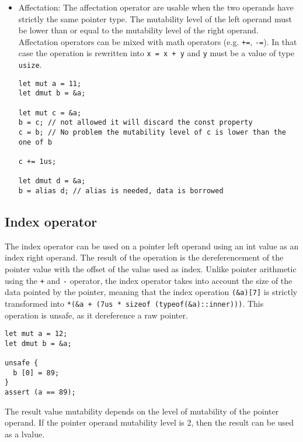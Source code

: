 \begin{itemize}
\item Affectation: The affectation operator are usable when the two operands
  have strictly the same pointer type. The mutability level of the left operand
  must be lower than or equal to the mutability level of the right operand.
  Affectation operators can be mixed with math operators (e.g. \texttt{+=},
  \texttt{-=}). In that case the operation is rewritten into \texttt{x = x + y}
  and \texttt{y} must be a value of type \texttt{usize}.

  \begin{lstlisting}[style=coloredverbatim]
let mut a = 11;
let dmut b = &a;

let mut c = &a;
b = c; // not allowed it will discard the const property
c = b; // No problem the mutability level of c is lower than the one of b

c += 1us;

let dmut d = &a;
b = alias d; // alias is needed, data is borrowed
  \end{lstlisting}

\end{itemize}

\subsection {Index operator}

The index operator can be used on a pointer left operand using an int value as
an index right operand. The result of the operation is the dereferencement of
the pointer value with the offset of the value used as index. Unlike pointer
arithmetic using the \texttt{+} and \texttt{-} operator, the index operator
takes into account the size of the data pointed by the pointer, meaning that the
index operation \texttt{(\&a)[7]} is strictly transformed into \texttt{*(\&a +
  (7us * sizeof (typeof(\&a)::inner)))}. This operation is unsafe, as it
dereference a raw pointer.

\smallskip

\begin{lstlisting}[style=coloredverbatim]
let mut a = 12;
let dmut b = &a;

unsafe {
  b [0] = 89;
}
assert (a == 89);
\end{lstlisting}

\smallskip
The result value mutability depends on the level of mutability of the pointer
operand. If the pointer operand mutability level is 2, then the result can be
used as a lvalue.

